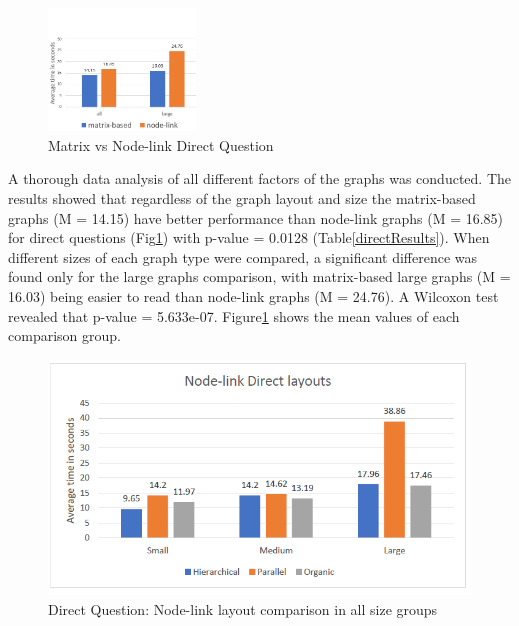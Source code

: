 \documentclass{l4proj}
\begin{document}
\begin{figure}
	\centering
	\vspace{-20mm}
    \includegraphics[width=0.35\textwidth]{images/directComparison.PNG}
    \caption{Matrix vs Node-link Direct Question} 
	\label{directComparison}
\end{figure}


A thorough data analysis of all different factors of the graphs was conducted. The results showed that regardless of the graph layout and size the matrix-based graphs (M = 14.15) have better performance than node-link graphs (M = 16.85) for direct questions (Fig\ref{directComparison}) with p-value = 0.0128 (Table\ref{directResults}). When different sizes of each graph type were compared, a significant difference was found only for the large graphs comparison, with matrix-based large graphs (M = 16.03) being easier to read than node-link graphs (M = 24.76). A Wilcoxon test revealed that p-value = 5.633e-07. Figure\ref{directComparison} shows the mean values of each comparison group. 

\bigskip
\begin{figure}[!ht]
    \includegraphics[width=13cm]{images/nodelinkdirectlayouts.PNG}
    \vspace{-15pt}
    \centering
    \caption{Direct Question: Node-link layout comparison in all size groups}
	\label{nodelinkdirectlayouts}
\end{figure}
\end{document}
